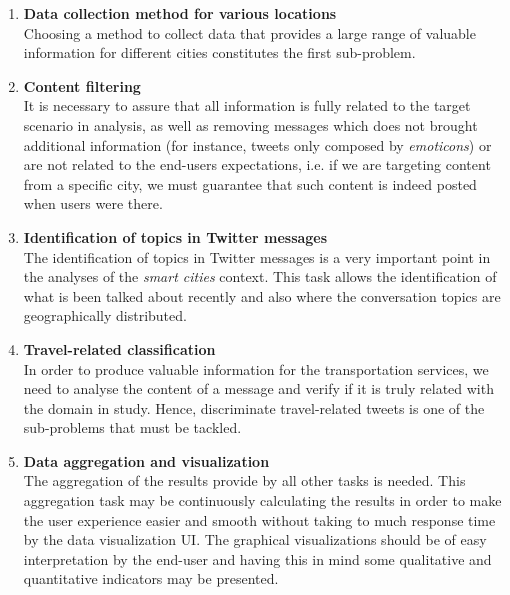 \begin{enumerate}
	\item \textbf{Data collection method for various locations}\\Choosing a method to collect data that provides a large range of valuable information for different cities constitutes the first sub-problem.
	
	\item \textbf{Content filtering}\\It is necessary to assure that all information is fully related to the target scenario in analysis, as well as removing messages which does not brought additional information (for instance, tweets only composed by \textit{emoticons}) or are not related to the end-users expectations, i.e. if we are targeting content from a specific city, we must guarantee that such content is indeed posted when users were there.
	
	\item \textbf{Identification of topics in Twitter messages}\\The identification of topics in Twitter messages is a very important point in the analyses of the \textit{smart cities} context. This task allows the identification of what is been talked about recently and also where the conversation topics are geographically distributed.
	
	\item \textbf{Travel-related classification}\\In order to produce valuable information for the transportation services, we need to analyse the content of a message and verify if it is truly related with the domain in study. Hence, discriminate travel-related tweets is one of the sub-problems that must be tackled.
	
	\item \textbf{Data aggregation and visualization}\\The aggregation of the results provide by all other tasks is needed. This aggregation task may be continuously calculating the results in order to make the user experience easier and smooth without taking to much response time by the data visualization \gls{UI}. The graphical visualizations should be of easy interpretation by the end-user and having this in mind some qualitative and quantitative indicators may be presented.
\end{enumerate}
\fi

